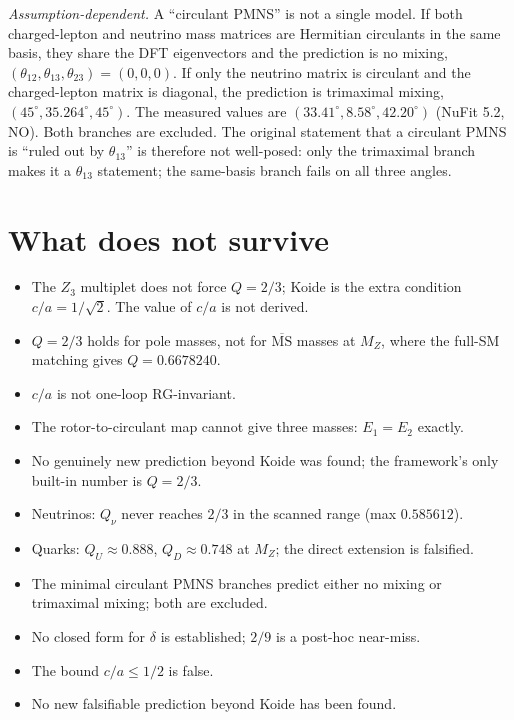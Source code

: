 \documentclass[11pt]{article}
\begin{document}
\emph{Assumption-dependent.} A ``circulant PMNS'' is not a single model. If
both charged-lepton and neutrino mass matrices are Hermitian circulants in the
same basis, they share the DFT eigenvectors and the prediction is no mixing,
$(\theta_{12},\theta_{13},\theta_{23})=(0,0,0)$. If only the neutrino matrix
is circulant and the charged-lepton matrix is diagonal, the prediction is
trimaximal mixing, $(45^\circ,35.264^\circ,45^\circ)$. The measured values are
$(33.41^\circ,8.58^\circ,42.20^\circ)$ (NuFit 5.2, NO). Both branches are
excluded. The original statement that a circulant PMNS is ``ruled out by
$\theta_{13}$'' is therefore not well-posed: only the trimaximal branch makes
it a $\theta_{13}$ statement; the same-basis branch fails on all three angles.

\section{What does not survive}
\label{sec:negative}

\begin{itemize}
\item The $Z_3$ multiplet does not force $Q=2/3$; Koide is the extra condition
$c/a=1/\sqrt2$. The value of $c/a$ is not derived.
\item $Q=2/3$ holds for pole masses, not for $\overline{\mathrm{MS}}$ masses at
$M_Z$, where the full-SM matching gives $Q=0.6678240$.
\item $c/a$ is not one-loop RG-invariant.
\item The rotor-to-circulant map cannot give three masses: $E_1=E_2$ exactly.
\item No genuinely new prediction beyond Koide was found; the framework's only built-in number is $Q=2/3$.
\item Neutrinos: $Q_\nu$ never reaches $2/3$ in the scanned range (max $0.585612$).
\item Quarks: $Q_U\approx0.888$, $Q_D\approx0.748$ at $M_Z$; the direct extension is falsified.
\item The minimal circulant PMNS branches predict either no mixing or trimaximal mixing; both are excluded.
\item No closed form for $\delta$ is established; $2/9$ is a post-hoc near-miss.
\item The bound $c/a\le1/2$ is false.
\item No new falsifiable prediction beyond Koide has been found.
\end{itemize}
\end{document}
